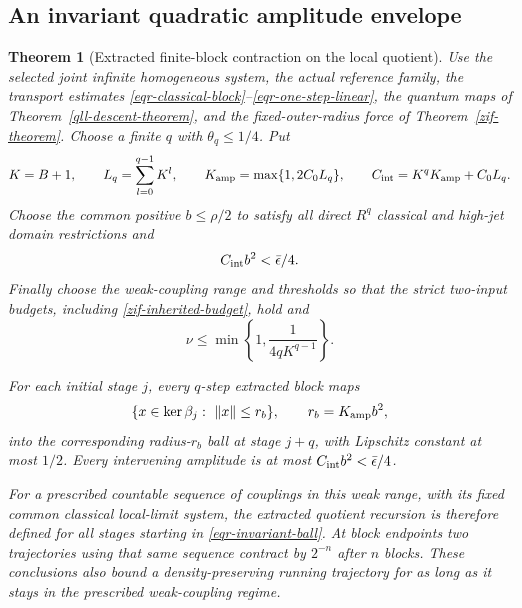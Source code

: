 \documentclass[11pt]{article}
\newtheorem{theorem}{Theorem}[section]
\theoremstyle{remark}
\begin{document}
\subsection{An invariant quadratic amplitude envelope}
\label{eqr-envelope-section}

\begin{theorem}[Extracted finite-block contraction on the local quotient]
\label{eqr-envelope-theorem}
Use the selected joint infinite homogeneous system, the actual
reference family, the transport estimates
\eqref{eqr-classical-block}--\eqref{eqr-one-step-linear},
the quantum maps of Theorem~\ref{qll-descent-theorem}, and the
fixed-outer-radius force of Theorem~\ref{zif-theorem}.
Choose a finite $q$ with $\theta_q\le1/4$. Put
\begin{equation}
 K=B+1,\qquad L_q=\sum_{l=0}^{q-1}K^l,\qquad
 K_{\rm amp}=\max\{1,2C_0L_q\},\qquad
 C_{\rm int}=K^qK_{\rm amp}+C_0L_q.
 \label{eqr-envelope-constants}
\end{equation}
Choose the common positive $b\le\rho/2$ to satisfy all direct
$R^q$ classical and high-jet domain restrictions and
\begin{equation}
                  C_{\rm int}b^2<\bar\epsilon/4.
 \label{eqr-inner-radius}
\end{equation}
Finally choose the weak-coupling range and thresholds so that the
strict two-input budgets, including
\eqref{zif-inherited-budget}, hold and
\begin{equation}
             \nu\le\min\left\{1,\frac1{4qK^{q-1}}\right\}.
 \label{eqr-nu-choice}
\end{equation}

For each initial stage $j$, every $q$-step extracted block maps
\begin{equation}
 \{x\in\ker\beta_j:\ \|x\|\le r_b\},
                \qquad r_b=K_{\rm amp}b^2,
 \label{eqr-invariant-ball}
\end{equation}
into the corresponding radius-$r_b$ ball at stage $j+q$, with
Lipschitz constant at most $1/2$. Every intervening amplitude is
at most $C_{\rm int}b^2<\bar\epsilon/4$.

For a prescribed countable sequence of couplings in this weak
range, with its fixed common classical local-limit system,
the extracted quotient recursion is therefore defined for all
stages starting in \eqref{eqr-invariant-ball}. At block endpoints
two trajectories using that same sequence contract by $2^{-n}$
after $n$ blocks. These conclusions also bound a density-preserving
running trajectory for as long as it stays in the prescribed
weak-coupling regime.
\end{theorem}
\end{document}
